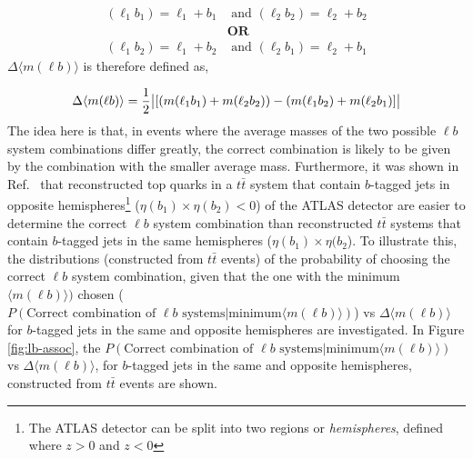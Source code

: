 \begin{align}
    (\ell_{1} b_{1}) = \ell_{1} + b_{1} &\text{ and }  (\ell_{2} b_{2})  = \ell_{2} + b_{2} \\
    &\textbf{OR}\nonumber\\ 
     (\ell_{1} b_{2}) = \ell_{1} + b_{2} &\text{ and }  (\ell_{2} b_{1})  = \ell_{2} + b_{1} 
\end{align}$\Delta \langle m(\ell b) \rangle$ is therefore defined as,

\begin{equation}
    \Delta \langle m(\ell b) \rangle = \frac{1}{2} \abs{[( m(\ell_{1} b_{1}) + m(\ell_{2} b_{2}) ) - ( m(\ell_{1} b_{2}) + m(\ell_{2} b_{1}) ]}
\end{equation}The idea here is that, in events where the average masses of the two possible $\ell b$ system combinations differ greatly, the correct combination is likely to be given by the combination with the smaller average mass. Furthermore, it was shown in Ref.~\cite{2vSM-ref1} that reconstructed top quarks in a $t\bar{t}$ system that contain $b$-tagged jets in opposite hemispheres\footnote{The ATLAS detector can be split into two regions or \textit{hemispheres}, defined where $z > 0$ and $z < 0$} ($\eta(b_{1}) \times \eta(b_{2}) < 0$) of the ATLAS detector are easier to determine the correct $\ell b$ system combination than reconstructed $t\bar{t}$ systems that contain $b$-tagged jets in the same hemispheres ($\eta(b_{1}) \times \eta(b_{2}$). To illustrate this, the distributions (constructed from $t\bar{t}$ events) of the probability of choosing the correct $\ell b$ system combination, given that the one with the minimum $\langle m(\ell b) \rangle)$ chosen ($P(\text{Correct combination of } \ell b \text{ systems} | \text{minimum} \langle m(\ell b) \rangle)$) vs $\Delta \langle m(\ell b) \rangle$ for $b$-tagged jets in the same and opposite hemispheres are investigated. In Figure \ref{fig:lb-assoc}, the $P(\text{Correct combination of } \ell b \text{ systems} | \text{minimum} \langle m(\ell b) \rangle)$ vs $\Delta \langle m(\ell b) \rangle$, for $b$-tagged jets in the same and opposite hemispheres, constructed from $t\bar{t}$ events are shown.
